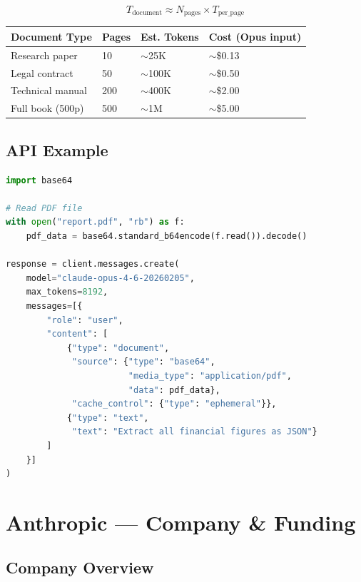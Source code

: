 \documentclass[11pt,a4paper]{article}
\begin{document}
$$T_{\text{document}} \approx N_{\text{pages}} \times T_{\text{per\_page}}$$

\begin{center}
\begin{tabular}{llll}
\toprule
\textbf{Document Type} & \textbf{Pages} & \textbf{Est. Tokens} & \textbf{Cost (Opus input)} \\
\midrule
Research paper & 10 & $\sim$25K & $\sim$\$0.13 \\
Legal contract & 50 & $\sim$100K & $\sim$\$0.50 \\
Technical manual & 200 & $\sim$400K & $\sim$\$2.00 \\
Full book (500p) & 500 & $\sim$1M & $\sim$\$5.00 \\
\bottomrule
\end{tabular}
\end{center}

\subsection{API Example}

\begin{lstlisting}[language=Python, caption={PDF Processing}]
import base64

# Read PDF file
with open("report.pdf", "rb") as f:
    pdf_data = base64.standard_b64encode(f.read()).decode()

response = client.messages.create(
    model="claude-opus-4-6-20260205",
    max_tokens=8192,
    messages=[{
        "role": "user",
        "content": [
            {"type": "document",
             "source": {"type": "base64",
                        "media_type": "application/pdf",  
                        "data": pdf_data},
             "cache_control": {"type": "ephemeral"}},
            {"type": "text",
             "text": "Extract all financial figures as JSON"}
        ]
    }]
)
\end{lstlisting}

\section{Anthropic --- Company \& Funding}

\subsection{Company Overview}
\end{document}
